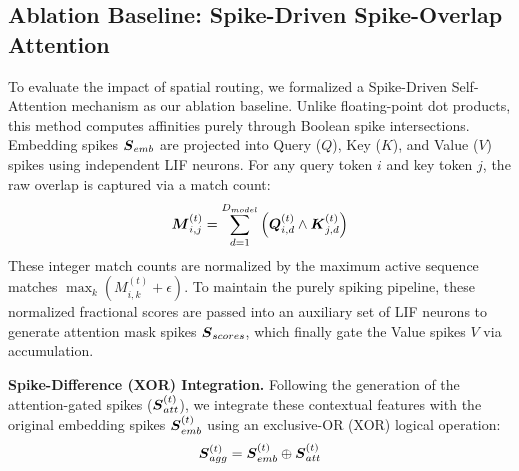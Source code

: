 \documentclass[10pt,journal,compsoc]{IEEEtran}
\begin{document}
\subsection{Ablation Baseline: Spike-Driven Spike-Overlap Attention}
To evaluate the impact of spatial routing, we formalized a Spike-Driven Self-Attention mechanism as our ablation baseline. Unlike floating-point dot products, this method computes affinities purely through Boolean spike intersections.
Embedding spikes $\boldsymbol{S}_{emb}$ are projected into Query ($Q$), Key ($K$), and Value ($V$) spikes using independent LIF neurons. For any query token $i$ and key token $j$, the raw overlap is captured via a match count:
\begin{equation}
\boldsymbol{M}_{i,j}^{(t)} = \sum_{d=1}^{D_{model}} \left( \boldsymbol{Q}_{i,d}^{(t)} \wedge \boldsymbol{K}_{j,d}^{(t)} \right)
\end{equation}
These integer match counts are normalized by the maximum active sequence matches $\max_k (M_{i,k}^{(t)} + \epsilon)$. To maintain the purely spiking pipeline, these normalized fractional scores are passed into an auxiliary set of LIF neurons to generate attention mask spikes $\boldsymbol{S}_{scores}$, which finally gate the Value spikes $V$ via accumulation.

\textbf{Spike-Difference (XOR) Integration.} Following the generation of the attention-gated spikes ($\boldsymbol{S}_{att}^{(t)}$), we integrate these contextual features with the original embedding spikes $\boldsymbol{S}_{emb}^{(t)}$ using an exclusive-OR (XOR) logical operation:
\begin{equation}
\boldsymbol{S}_{agg}^{(t)} = \boldsymbol{S}_{emb}^{(t)} \oplus \boldsymbol{S}_{att}^{(t)}
\end{equation}
\end{document}
